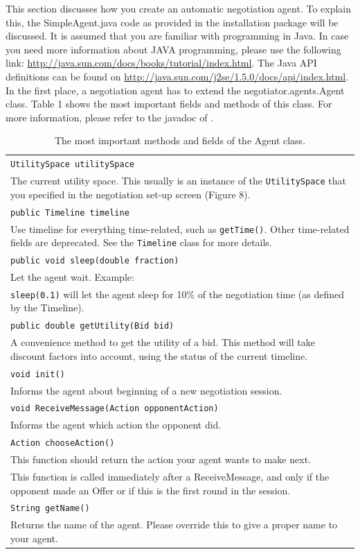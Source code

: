 \documentclass[]{article}
\begin{document}
This section discusses how you create an automatic negotiation agent. To explain this, the SimpleAgent.java code as provided in the installation package will be discussed.
It is assumed that you are familiar with programming in Java. In case you need more information about JAVA programming, please use the following link: \url{http://java.sun.com/docs/books/tutorial/index.html}. The Java API definitions can be found on \url{http://java.sun.com/j2se/1.5.0/docs/api/index.html}.
In the first place, a negotiation agent has to extend the negotiator.agents.Agent class. Table 1 shows the most important fields and methods of this class. For more information, please refer to the javadoc of \Genius.

\begin{table}
\begin{tabular}{m{}}
\hline
\texttt{UtilitySpace utilitySpace}\\
The current utility space. This usually is an instance of the \texttt{UtilitySpace} that you specified in the negotiation set-up screen (Figure 8).\\
\hline
\texttt{public Timeline timeline}\\
Use timeline for everything time-related, such as \texttt{getTime()}. Other time-related fields are deprecated. See the \texttt{Timeline} class for more details.\\
\hline
\texttt{public void sleep(double fraction)}\\
Let the agent wait. Example:\\
\texttt{sleep(0.1)} will let the agent sleep for 10\% of the negotiation time (as defined by the Timeline).\\
\hline
\texttt{public double getUtility(Bid bid)}\\
A convenience method to get the utility of a bid. This method will take discount factors into account, using the status of the current timeline.\\
\hline
\texttt{void init()}\\
Informs the agent about beginning of a new negotiation session.\\
\hline
\texttt{void ReceiveMessage(Action opponentAction)}\\
Informs the agent which action the opponent did.\\
\hline
\texttt{Action chooseAction()}\\
This function should return the action your agent wants to make next.\\
This function is called immediately after a ReceiveMessage, and only if the opponent made an Offer or if this is the first round in the session.\\
\hline
\texttt{String getName()}\\
Returns the name of the agent. Please override this to give a proper name to your agent.\\
\hline
\end{tabular}
\caption{The most important methods and fields of the Agent class.}
\end{table}
\end{document}
